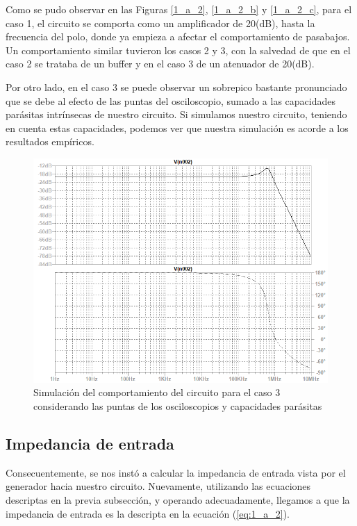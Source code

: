 Como se pudo observar en las Figuras \ref{1_a_2}, \ref{1_a_2_b}
y \ref{1_a_2_c}, para el caso 1, el circuito se comporta como un
amplificador de 20(dB), hasta la frecuencia del polo, donde ya empieza
a afectar el comportamiento de pasabajos. Un comportamiento similar
tuvieron los casos 2 y 3, con la salvedad de que en el caso 2 se trataba
de un buffer y en el caso 3 de un atenuador de 20(dB).

Por otro lado, en el caso 3 se puede observar un sobrepico bastante
pronunciado que se debe al efecto de las puntas del osciloscopio,
sumado a las capacidades parásitas intrínsecas de nuestro circuito.
Si simulamos nuestro circuito, teniendo en cuenta estas capacidades,
podemos ver que nuestra simulación es acorde a los resultados empíricos.

\begin{figure}[H]
\begin{centering}
\includegraphics[scale=0.5]{../Ex1/iA/Resources1a/H3_para}
\par\end{centering}
\caption{Simulación del comportamiento del circuito para el caso 3 considerando
las puntas de los osciloscopios y capacidades parásitas}

\end{figure}

\subsection{Impedancia de entrada\label{subsec:1_a_2}}

Consecuentemente, se nos instó a calcular la impedancia de entrada
vista por el generador hacia nuestro circuito. Nuevamente, utilizando
las ecuaciones descriptas en la previa subsección, y operando adecuadamente,
llegamos a que la impedancia de entrada es la descripta en la ecuación
(\ref{eq:1_a_2}).

